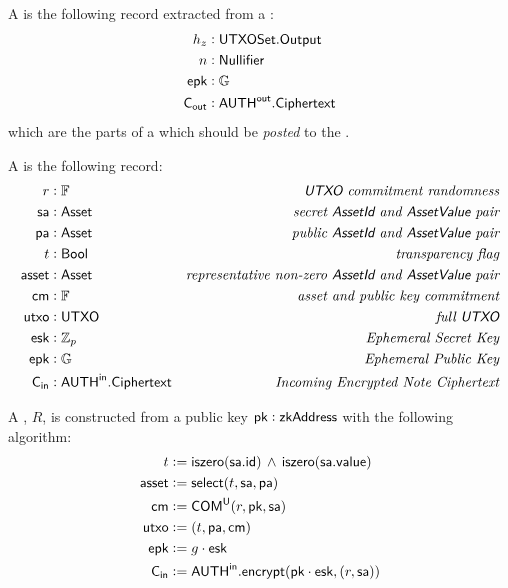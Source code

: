 \begin{definition}
    A \SenderPost{} is the following record extracted from a \Sender{}:
    \begin{align*}
        h_z   &: {\textsf{UTXOSet}}.{\textsf{Output}} \\
        n     &: {\textsf{Nullifier}} \\
        {\textsf{epk}}  &: {\mathbb{G}} \\
        {\textsf{C}_\textsf{out}} &: {{\textsf{AUTH}}^\textsf{out}}.{\textsf{Ciphertext}}
    \end{align*}
    which are the parts of a \Sender{} which should be \emph{posted} to the \Ledger{}.
\end{definition}

\begin{definition}
    A \Receiver{} is the following record:
    \begin{align*}
        r      &: {\mathbb{F}}                  & \textit{{\textsf{UTXO}}{} commitment randomness} \\
        {\textsf{sa}}    &: {\textsf{Asset}}              & \textit{secret {\textsf{AssetId}}{} and {\textsf{AssetValue}}{} pair} \\
        {\textsf{pa}}    &: {\textsf{Asset}}              & \textit{public {\textsf{AssetId}}{} and {\textsf{AssetValue}}{} pair} \\
        t      &: {\textsf{Bool}}               & \textit{transparency flag} \\
        {\textsf{asset}} &: {\textsf{Asset}}              & \textit{representative non-zero {\textsf{AssetId}}{} and {\textsf{AssetValue}}{} pair} \\
        {\textsf{cm}}    &: {\mathbb{F}}                  & \textit{asset and public key commitment} \\
        {\textsf{utxo}}  &: {\textsf{UTXO}}               & \textit{full {\textsf{UTXO}}{}} \\
        {\textsf{esk}}   &: {\mathbb{Z}}_p                & \textit{Ephemeral Secret Key} \\
        {\textsf{epk}}   &: {\mathbb{G}}                  & \textit{Ephemeral Public Key} \\
        {\textsf{C}_\textsf{in}}   &: {{\textsf{AUTH}}^\textsf{in}}.{\textsf{Ciphertext}} & \textit{Incoming Encrypted Note Ciphertext}
    \end{align*}
    
    A \Receiver{}, $R$, is constructed from a public key ${\textsf{pk}} : {\textsf{zkAddress}}$ with the following algorithm:
    \begin{align*}
        t      &:= {\textsf{iszero}}({\textsf{sa}}.{\textsf{id}}) \,\wedge\, {\textsf{iszero}}({\textsf{sa}}.{\textsf{value}}) \\
        {\textsf{asset}} &:= {\textsf{select}}(t, {\textsf{sa}}, {\textsf{pa}}) \\
        {\textsf{cm}}    &:= {\textsf{COM}}^{{\textsf{U}}}(r, {\textsf{pk}}, {\textsf{sa}}) \\
        {\textsf{utxo}}  &:= (t, {\textsf{pa}}, {\textsf{cm}}) \\
        {\textsf{epk}}   &:= g \cdot {\textsf{esk}} \\
        {\textsf{C}_\textsf{in}}   &:= {{\textsf{AUTH}}^\textsf{in}}.{\textsf{encrypt}}({\textsf{pk}} \cdot {\textsf{esk}}, (r, {\textsf{sa}}))
    \end{align*}
\end{definition}

